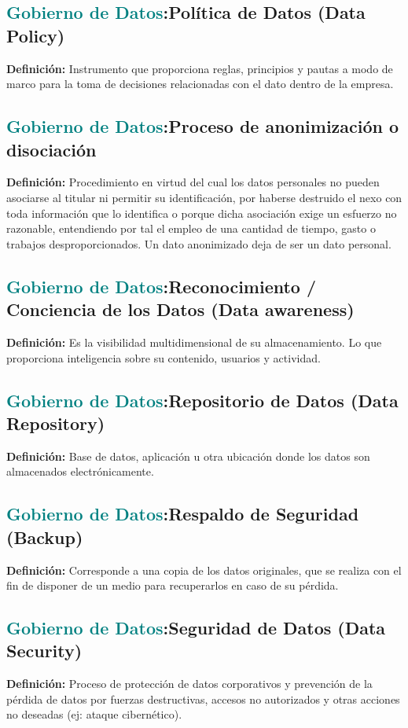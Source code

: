 \documentclass[12pt]{article}
\begin{document}
\subsection{\textcolor{teal}{Gobierno de Datos}:{Política de Datos (Data Policy)}}
\textbf{Definición:} Instrumento que proporciona reglas, principios y pautas a modo de marco para la toma de decisiones relacionadas con el dato dentro de la empresa.
\subsection{\textcolor{teal}{Gobierno de Datos}:{Proceso de anonimización o disociación}}
\textbf{Definición:} Procedimiento en virtud del cual los datos personales no pueden asociarse al titular ni permitir su identificación, por haberse destruido el nexo con toda información que lo identifica o porque dicha asociación exige un esfuerzo no razonable, entendiendo por tal el empleo de una cantidad de tiempo, gasto o trabajos desproporcionados. Un dato anonimizado deja de ser un dato personal. 
\subsection{\textcolor{teal}{Gobierno de Datos}:{Reconocimiento / Conciencia de los Datos (Data awareness)}}
\textbf{Definición:} Es la visibilidad multidimensional de su almacenamiento. Lo que proporciona inteligencia sobre su contenido, usuarios y actividad.
\subsection{\textcolor{teal}{Gobierno de Datos}:{Repositorio de Datos (Data Repository)}}
\textbf{Definición:} Base de datos, aplicación u otra ubicación donde los datos son almacenados electrónicamente.
\subsection{\textcolor{teal}{Gobierno de Datos}:{Respaldo de Seguridad (Backup)}}
\textbf{Definición:} Corresponde a una copia de los datos originales, que se realiza con el fin de disponer de un medio para recuperarlos en caso de su pérdida.
\subsection{\textcolor{teal}{Gobierno de Datos}:{Seguridad de Datos (Data Security)}}
\textbf{Definición:} Proceso de protección de datos corporativos y prevención de la pérdida de datos por fuerzas destructivas, accesos no autorizados y otras acciones no deseadas (ej: ataque cibernético).
\end{document}
